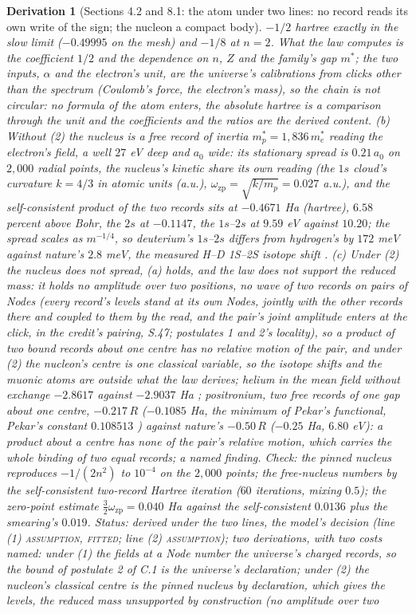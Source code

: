 \documentclass[pdflatex,sn-mathphys-num]{sn-jnl}
\newcommand{\claimmark}[1]{\textup{\textsc{#1}}}
\theoremstyle{thmstyleone}
\newtheorem{derivation}{Derivation}
\begin{document}
\begin{derivation}[Sections 4.2 and 8.1: the atom under two lines: no record reads its own write of the sign; the nucleon a compact body]
$-1 / 2$ hartree exactly in the slow limit ($-0.49995$ on the mesh) and $-1 / 8$ at $n = 2$. What the law computes is the coefficient $1 / 2$ and the dependence on $n$, $Z$ and the family's gap $m^*$; the two inputs, $\alpha$ and the electron's unit, are the universe's calibrations from clicks other than the spectrum (Coulomb's force, the electron's mass), so the chain is not circular: no formula of the atom enters, the absolute hartree is a comparison through the unit and the coefficients and the ratios are the derived content. (b) Without (2) the nucleus is a free record of inertia $m_p^* = 1{,}836\,m_e^*$ reading the electron's field, a well $27$ eV deep and $a_0$ wide: its stationary spread is $0.21\,a_0$ on $2{,}000$ radial points, the nucleus's kinetic share its own reading (the $1s$ cloud's curvature $k = 4 / 3$ in atomic units (a.u.), $\omega_{\mathrm{zp}} = \sqrt{k / m_p} = 0.027$ a.u.), and the self-consistent product of the two records sits at $-0.4671$ Ha (hartree), $6.58$ percent above Bohr, the $2s$ at $-0.1147$, the $1s$--$2s$ at $9.59$ eV against $10.20$; the spread scales as $m^{-1/4}$, so deuterium's $1s$--$2s$ differs from hydrogen's by $172$ meV against nature's $2.8$ meV, the measured H--D 1S--2S isotope shift \cite{parthey2010}. (c) Under (2) the nucleus does not spread, (a) holds, and the law does not support the reduced mass: it holds no amplitude over two positions, no wave of two records on pairs of Nodes (every record's levels stand at its own Nodes, jointly with the other records there and coupled to them by the read, and the pair's joint amplitude enters at the click, in the credit's pairing, S.47; postulates 1 and 2's locality), so a product of two bound records about one centre has no relative motion of the pair, and under (2) the nucleon's centre is one classical variable, so the isotope shifts and the muonic atoms are outside what the law derives; helium in the mean field without exchange $-2.8617$ against $-2.9037$ Ha \cite{pekeris}; positronium, two free records of one gap about one centre, $-0.217\,R$ ($-0.1085$ Ha, the minimum of Pekar's functional, Pekar's constant $0.108513$ \cite{lieb}) against nature's $-0.50\,R$ ($-0.25$ Ha, $6.80$ eV): a product about a centre has none of the pair's relative motion, which carries the whole binding of two equal records; a named finding. \emph{Check:} the pinned nucleus reproduces $-1 / (2n^2)$ to $10^{-4}$ on the $2{,}000$ points; the free-nucleus numbers by the self-consistent two-record Hartree iteration ($60$ iterations, mixing $0.5$); the zero-point estimate $\tfrac32\omega_{\mathrm{zp}} = 0.040$ Ha against the self-consistent $0.0136$ plus the smearing's $0.019$. \emph{Status:} derived under the two lines, the model's decision (line (1) \claimmark{assumption}, \claimmark{fitted}; line (2) \claimmark{assumption}); two derivations, with two costs named: under (1) the fields at a Node number the universe's charged records, so the bound of postulate 2 of C.1 is the universe's declaration; under (2) the nucleon's classical centre is the pinned nucleus by declaration, which gives the levels, the reduced mass unsupported by construction (no amplitude over two 
\end{derivation}
\end{document}
